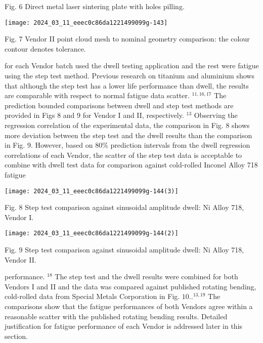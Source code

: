 \documentclass[10pt]{article}
\begin{document}
Fig. 6 Direct metal laser sintering plate with holes pilling.

\begin{center}
\texttt{[image: 2024\_03\_11\_eeec0c86da1221499099g-143]}
\end{center}

Fig. 7 Vendor II point cloud mesh to nominal geometry comparison: the colour contour denotes tolerance.

for each Vendor batch used the dwell testing application and the rest were fatigue using the step test method. Previous research on titanium and aluminium shows that although the step test has a lower life performance than dwell, the results are comparable with respect to normal fatigue data scatter. ${ }^{11,16,17}$ The prediction bounded comparisons between dwell and step test methods are provided in Figs 8 and 9 for Vendor I and II, respectively. ${ }^{13}$ Observing the regression correlation of the experimental data, the comparison in Fig. 8 shows more deviation between the step test and the dwell results than the comparison in Fig. 9. However, based on $80 \%$ prediction intervals from the dwell regression correlations of each Vendor, the scatter of the step test data is acceptable to combine with dwell test data for comparison against cold-rolled Inconel Alloy 718 fatigue

\begin{center}
\texttt{[image: 2024\_03\_11\_eeec0c86da1221499099g-144(3)]}
\end{center}

Fig. 8 Step test comparison against sinusoidal amplitude dwell: Ni Alloy 718, Vendor I.

\begin{center}
\texttt{[image: 2024\_03\_11\_eeec0c86da1221499099g-144(2)]}
\end{center}

Fig. 9 Step test comparison against sinusoidal amplitude dwell: Ni Alloy 718, Vendor II.

performance. ${ }^{18}$ The step test and the dwell results were combined for both Vendors I and II and the data was compared against published rotating bending, cold-rolled data from Special Metals Corporation in Fig. $10 . .^{13,19}$ The comparisons show that the fatigue performances of both Vendors agree within a reasonable scatter with the published rotating bending results. Detailed justification for fatigue performance of each Vendor is addressed later in this section.
\end{document}

